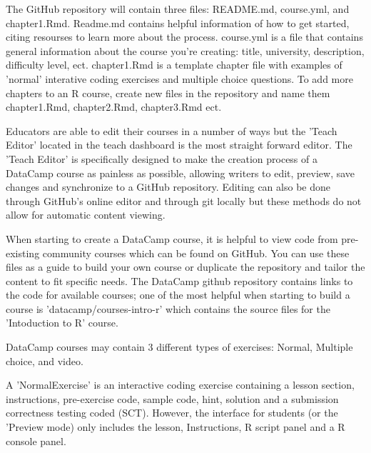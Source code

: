 \documentclass[12pt]{article}
\begin{document}
The GitHub repository will contain three files: README.md, course.yml, and chapter1.Rmd.
Readme.md contains helpful information of how to get started, citing resourses to learn more about the process.
course.yml is a file that contains general information about the course you're creating: title, university, description,
difficulty level, ect.
chapter1.Rmd is a template chapter file with examples of 'normal' interative coding exercises and multiple choice questions.
To add more chapters to an R course, create new files in the repository and name them chapter1.Rmd, chapter2.Rmd, chapter3.Rmd
ect.

Educators are able to edit their courses in a number of ways but the 'Teach Editor' located in the teach dashboard is the
most straight forward editor. The 'Teach Editor' is specifically designed to make the creation process of a DataCamp course
as painless as possible, allowing writers to edit, preview, save changes and synchronize to a GitHub repository. Editing can
also be done through GitHub's online editor and through git locally but these methods do not allow for automatic content
viewing.

When starting to create a DataCamp course, it is helpful to view code from pre-existing community courses which can be found on GitHub.
You can use these files as a guide to build your own course or duplicate the repository and tailor the content to fit specific needs.
The DataCamp github repository contains links to the code for available courses; one of the most helpful when starting to build a course 
is 'datacamp/courses-intro-r' which contains the source files for the 'Intoduction to R' course.


DataCamp courses may contain 3 different types of exercises: Normal, Multiple choice, and video.

A 'NormalExercise' is an interactive coding exercise containing a lesson section, instructions, pre-exercise code, sample
code, hint, solution and a submission correctness testing coded (SCT). However, the interface for students (or the 'Preview
mode) only includes the lesson, Instructions, R script panel and a R console panel.
\end{document}
